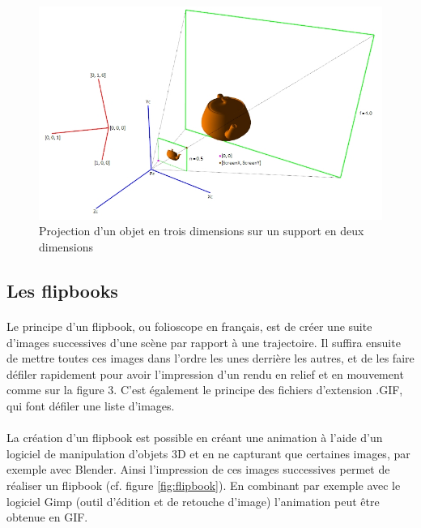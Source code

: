 \begin{figure}[h]
		\centering
		\includegraphics[scale=0.7]{projection.png}
		\caption{\label{fig:projection} Projection d’un objet en trois dimensions sur un support en deux dimensions \protect \footnotemark }
\end{figure}
	
\subsection{Les flipbooks}

\paragraph{}
	Le principe d’un flipbook, ou folioscope en français, est de créer une suite d’images successives d’une scène par rapport à une trajectoire. Il suffira ensuite de mettre toutes ces images dans l’ordre les unes derrière les autres, et de les faire défiler rapidement pour avoir l’impression d’un rendu en relief et en mouvement comme sur la figure 3. C’est également le principe des fichiers d’extension .GIF, qui font défiler une liste d’images.
	
\paragraph{}
	La création d’un flipbook est possible en créant une animation à l’aide d’un logiciel de manipulation d’objets 3D et en ne capturant que certaines images, par exemple avec Blender. Ainsi l’impression de ces images successives permet de réaliser un flipbook (cf. figure \ref{fig:flipbook}). En combinant par exemple avec le logiciel Gimp (outil d’édition et de retouche d’image) l’animation peut être obtenue en GIF. 

